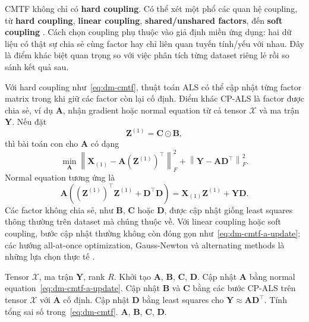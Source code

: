 CMTF không chỉ có \textbf{hard coupling}. Có thể xét một phổ các quan hệ coupling, từ \textbf{hard coupling}, \textbf{linear coupling}, \textbf{shared/unshared factors}, đến \textbf{soft coupling} \cite{chrysos2025foundationsTutorial}. Cách chọn coupling phụ thuộc vào giả định miền ứng dụng: hai dữ liệu có thật sự chia sẻ cùng factor hay chỉ liên quan tuyến tính/yếu với nhau. Đây là điểm khác biệt quan trọng so với việc phân tích từng dataset riêng lẻ rồi so sánh kết quả sau.

Với hard coupling như~\eqref{eq:dm-cmtf}, thuật toán ALS có thể cập nhật từng factor matrix trong khi giữ các factor còn lại cố định. Điểm khác CP-ALS là factor được chia sẻ, ví dụ $\mathbf{A}$, nhận gradient hoặc normal equation từ cả tensor $\mathcal{X}$ và ma trận $\mathbf{Y}$. Nếu đặt
\begin{equation}
    \mathbf{Z}^{(1)}=\mathbf{C}\odot\mathbf{B},
    \label{eq:dm-cmtf-z}
\end{equation}
thì bài toán con cho $\mathbf{A}$ có dạng
\begin{equation}
    \min_{\mathbf{A}}
    \left\|
    \mathbf{X}_{(1)}-\mathbf{A}(\mathbf{Z}^{(1)})^\top
    \right\|_F^2
    +
    \left\|
    \mathbf{Y}-\mathbf{A}\mathbf{D}^{\top}
    \right\|_F^2.
    \label{eq:dm-cmtf-a-subproblem}
\end{equation}
Normal equation tương ứng là
\begin{equation}
    \mathbf{A}
    \left(
    (\mathbf{Z}^{(1)})^\top\mathbf{Z}^{(1)}
    +
    \mathbf{D}^{\top}\mathbf{D}
    \right)
    =
    \mathbf{X}_{(1)}\mathbf{Z}^{(1)}
    +
    \mathbf{Y}\mathbf{D}.
    \label{eq:dm-cmtf-a-update}
\end{equation}
Các factor không chia sẻ, như $\mathbf{B}$, $\mathbf{C}$ hoặc $\mathbf{D}$, được cập nhật giống least squares thông thường trên dataset mà chúng thuộc về. Với linear coupling hoặc soft coupling, bước cập nhật thường không còn đóng gọn như~\eqref{eq:dm-cmtf-a-update}; các hướng all-at-once optimization, Gauss-Newton và alternating methods là những lựa chọn thực tế \cite{chrysos2025foundationsTutorial}.

\begin{algorithm}[H]
\caption{ALS cho CMTF với hard coupling trên $\mathbf{A}$}
\label{alg:dm-cmtf-als}
\begin{algorithmic}[1]
    \Require Tensor $\mathcal{X}$, ma trận $\mathbf{Y}$, rank $R$.
    \State Khởi tạo $\mathbf{A}$, $\mathbf{B}$, $\mathbf{C}$, $\mathbf{D}$.
    \Repeat
        \State Cập nhật $\mathbf{A}$ bằng normal equation~\eqref{eq:dm-cmtf-a-update}.
        \State Cập nhật $\mathbf{B}$ và $\mathbf{C}$ bằng các bước CP-ALS trên tensor $\mathcal{X}$ với $\mathbf{A}$ cố định.
        \State Cập nhật $\mathbf{D}$ bằng least squares cho $\mathbf{Y}\approx\mathbf{A}\mathbf{D}^{\top}$.
        \State Tính tổng sai số trong~\eqref{eq:dm-cmtf}.
    \State \Return $\mathbf{A}$, $\mathbf{B}$, $\mathbf{C}$, $\mathbf{D}$.
\end{algorithmic}
\end{algorithm}

